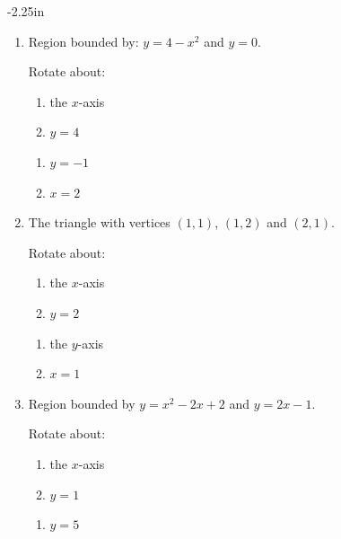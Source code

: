 \begin{adjustwidth*}{}{-2.25in}
\begin{multicols*}{2}
\begin{enumerate}[1),resume]
\item Region bounded by: $y=4-x^2$ and $y=0$.

Rotate about:

\noindent%
\begin{minipage}[t]{.5\linewidth}
\begin{enumerate}
\item		the $x$-axis
\item		$y=4$
\end{enumerate}
\end{minipage}
\begin{minipage}[t]{.5\linewidth}
\begin{enumerate}\addtocounter{enumii}{2}
\item		$y=-1$
\item		$x=2$
\end{enumerate}
\end{minipage}

\item The triangle with vertices $(1,1)$, $(1,2)$ and $(2,1)$.

Rotate about:

\noindent%
\begin{minipage}[t]{.5\linewidth}
\begin{enumerate}
\item		the $x$-axis
\item		$y=2$
\end{enumerate}
\end{minipage}
\begin{minipage}[t]{.5\linewidth}
\begin{enumerate}\addtocounter{enumii}{2}
\item		the $y$-axis
\item		$x=1$
\end{enumerate}
\end{minipage}

\item Region bounded by $y=x^2-2x+2$ and $y=2x-1$.

Rotate about:

\noindent%
\begin{minipage}[t]{.5\linewidth}
\begin{enumerate}
\item		the $x$-axis
\item		$y=1$
\end{enumerate}
\end{minipage}
\begin{minipage}[t]{.5\linewidth}
\begin{enumerate}\addtocounter{enumii}{2}
\item		$y=5$
\end{enumerate}
\end{minipage}


\end{enumerate}
\end{multicols*}
\end{adjustwidth*}
